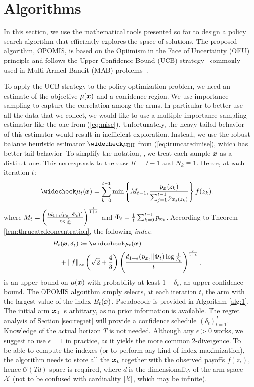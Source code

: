 \documentclass{article}
\makeatletter
\DeclareRobustCommand{\algoname}{OPOMIS\@\xspace}
\makeatother
\begin{document}
\section{Algorithms}
In this section, we use the mathematical tools presented so far to design a policy search algorithm that efficiently explores the space of solutions. The proposed algorithm, \algoname, is based on the Optimism in the Face of Uncertainty (OFU) principle and follows the Upper Confidence Bound (UCB) strategy~\citep{lai1985asymptotically,agrawal1995sample,auer2002finite} commonly used in Multi Armed Bandit (MAB) problems~\citep{robbins1985some,bubeck2012regret,lattimore2019bandit}. 

To apply the UCB strategy to the policy optimization problem, we need an estimate of the objective $\mu(\boldsymbol{x})$ and a confidence region. We use importance sampling to capture the correlation among the arms. In particular to better use all the data that we collect, we would like to use a multiple importance sampling estimator like the one from (\ref{eq:mise}). Unfortunately, the heavy-tailed behavior of this estimator would result in inefficient exploration.
Instead, we use the robust balance heuristic estimator $\wc{\mu}_{\text{BH}}$ from (\ref{eq:truncatedmise}), which has better tail behavior. To simplify the notation, \wlg, we treat each sample $\boldsymbol{x}$ as a distinct one. This corresponds to the case $K=t-1$ and $N_k\equiv1$. Hence, at each iteration $t$:
\begin{align}\label{eq:wcmu}
	\wc{\mu}_t(\vx) = \sum_{k=0}^{t-1}
	\min\left\{M_{t-1}, \frac{p_{\vx}(z_k)}
	{\sum_{j=1}^{t-1}p_{\vx_j(z_k)}}\right\}f(z_k),
\end{align}
where ${M_{t} = \left(\frac{td_{1+\epsilon}(p_{\boldsymbol{x}}\|\Phi_t)^{\epsilon}}{\log\frac{1}{\delta_t}}\right)^{\frac{1}{1+\epsilon}}}$ and ${\Phi_t = \frac{1}{t}\sum_{k=0}^{t-1}p_{\boldsymbol{x}_k}}$.
According to Theorem \ref{lem:thrucatedconcentration}, the following \textit{index}:
\begin{align}
	&B_t(\vx,\delta_t) \coloneqq 
	\wc{\mu}_t(\vx) \nonumber\\
	&\quad+\norm[\infty]{f}\left(\sqrt{2}+\frac{4}{3}\right)
	\left(\frac{d_{1+\epsilon}(p_{\vx_t}\|\Phi_{t})\log\frac{1}{\delta_t}}{t}\right)^{\frac{\epsilon}{1+\epsilon}},
\end{align}
is an upper bound on $\mu(\boldsymbol{x})$ with probability at least $1-\delta_t$, \ie an upper confidence bound. The \algoname algorithm simply selects, at each iteration $t$, the arm with the largest value of the index $B_t(\boldsymbol{x})$. Pseudocode is provided in Algorithm \ref{alg:1}. The initial arm $\boldsymbol{x}_0$ is arbitrary, as no prior information is available. The regret analysis of Section \ref{sec:regret} will provide a confidence schedule $(\delta_t)_{t=1}^T$. Knowledge of the actual horizon $T$ is not needed. Although any $\epsilon>0$ works, we suggest to use $\epsilon=1$ in practice, as it yields the more common $2$-\Renyi divergence. To be able to compute the indexes (or to perform any kind of index maximization), the algorithm needs to store all the $\boldsymbol{x}_t$ together with the observed payoffs $f(z_t)$, hence $\mathcal{O}(Td)$ space is required, where $d$ is the dimensionality of the arm space $\mathcal{X}$ (not to be confused with cardinality $|\mathcal{X}|$, which may be infinite). 
\end{document}
